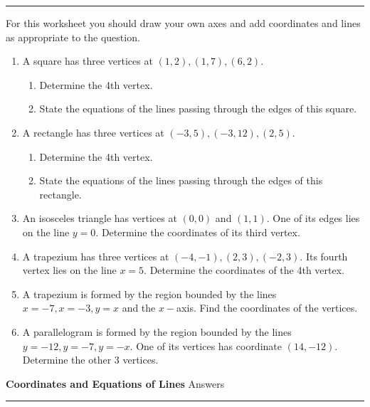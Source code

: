 \documentclass[12pt]{article}
\begin{document}
\hrule 

\bigskip

For this worksheet you should draw your own axes and add coordinates and lines as appropriate to the question.

\begin{enumerate}
    \item A square has three vertices at \((1,2), (1,7), (6,2)\).
    \begin{enumerate}
        \item Determine the 4th vertex.
        \item State the equations of the lines passing through the edges of this square.
    \end{enumerate}
    \item A rectangle has three vertices at \((-3,5), (-3,12), (2,5)\).
    \begin{enumerate}
        \item Determine the 4th vertex.
        \item State the equations of the lines passing through the edges of this rectangle.
    \end{enumerate}
    \item An isosceles triangle has vertices at \((0,0)\) and \((1,1)\). One of its edges lies on the line \(y=0\). Determine the coordinates of its third vertex.
    \item A trapezium has three vertices at \((-4,-1), (2,3), (-2,3)\). Its fourth vertex lies on the line \(x=5\). Determine the coordinates of the 4th vertex.
    \item A trapezium is formed by the region bounded by the lines \(x=-7, x=-3, y=x\) and the \(x-\)axis. Find the coordinates of the vertices.
    \item A parallelogram is formed by the region bounded by the lines \(y=-12, y=-7, y=-x\). One of its vertices has coordinate \((14,-12)\). Determine the other 3 vertices.
    
\end{enumerate}

\newpage

\noindent \textbf{Coordinates and Equations of Lines} \hfill Answers

\medskip

\hrule 

\bigskip
\end{document}
